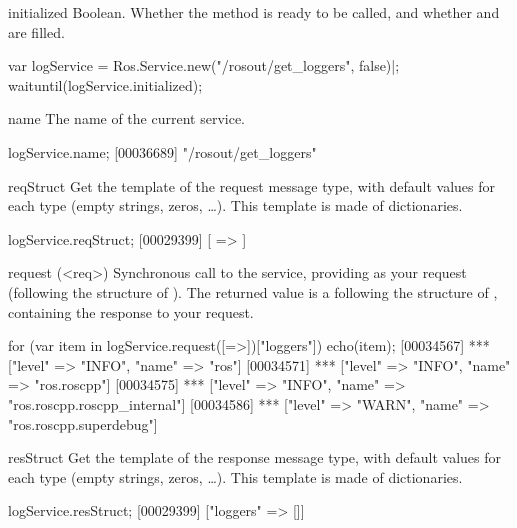 \begin{urbiscriptapi}
\item[initialized]%
  Boolean.  Whether the method  is ready to be called, and
  whether  and  are filled.
\begin{urbiscript}
var logService = Ros.Service.new("/rosout/get_loggers", false)|;
waituntil(logService.initialized);
\end{urbiscript}


\item[name]%
  The name of the current service.
\begin{urbiscript}
logService.name;
[00036689] "/rosout/get_loggers"
\end{urbiscript}


\item[reqStruct]%
  Get the template of the request message type, with default values for
  each type (empty strings, zeros, \ldots). This template is made of
  dictionaries.
\begin{urbiscript}
logService.reqStruct;
[00029399] [ => ]
\end{urbiscript}


\item[request](<req>)%
  Synchronous call to the service, providing  as your request
  (following the structure of ). The returned value is a
   following the structure of ,
  containing the response to your request.
\begin{urbiscript}
for (var item in logService.request([=>])["loggers"])
  echo(item);
[00034567] *** ["level" => "INFO", "name" => "ros"]
[00034571] *** ["level" => "INFO", "name" => "ros.roscpp"]
[00034575] *** ["level" => "INFO", "name" => "ros.roscpp.roscpp_internal"]
[00034586] *** ["level" => "WARN", "name" => "ros.roscpp.superdebug"]
\end{urbiscript}


\item[resStruct]%
  Get the template of the response message type, with default values for
  each type (empty strings, zeros, \ldots). This template is made of
  dictionaries.
\begin{urbiscript}
logService.resStruct;
[00029399] ["loggers" => []]
\end{urbiscript}
\end{urbiscriptapi}

